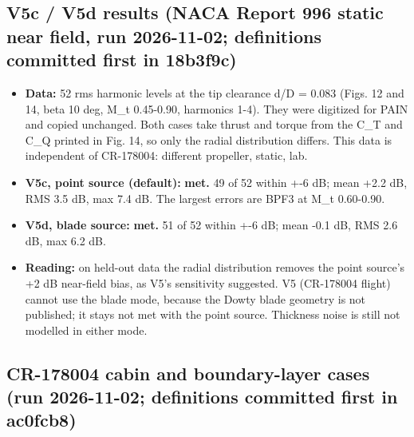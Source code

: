 \documentclass[10pt,a4paper]{article}
\begin{document}
\subsection*{V5c / V5d results (NACA Report 996 static near field, run 2026-11-02; definitions committed first in 18b3f9c)}

\begin{itemize}
\item \textbf{Data:} 52 rms harmonic levels at the tip clearance d/D = 0.083 (Figs. 12 and 14, beta 10 deg, M\_t 0.45-0.90, harmonics 1-4). They were digitized for PAIN and copied unchanged. Both cases take thrust and torque from the C\_T and C\_Q printed in Fig. 14, so only the radial distribution differs. This data is independent of CR-178004: different propeller, static, lab.
\item \textbf{V5c, point source (default):} \textbf{met.} 49 of 52 within +-6 dB; mean +2.2 dB, RMS 3.5 dB, max 7.4 dB. The largest errors are BPF3 at M\_t 0.60-0.90.
\item \textbf{V5d, blade source:} \textbf{met.} 51 of 52 within +-6 dB; mean -0.1 dB, RMS 2.6 dB, max 6.2 dB.
\item \textbf{Reading:} on held-out data the radial distribution removes the point source's +2 dB near-field bias, as V5's sensitivity suggested. V5 (CR-178004 flight) cannot use the blade mode, because the Dowty blade geometry is not published; it stays not met with the point source. Thickness noise is still not modelled in either mode.
\end{itemize}

\subsection*{CR-178004 cabin and boundary-layer cases (run 2026-11-02; definitions committed first in ac0fcb8)}
\end{document}
